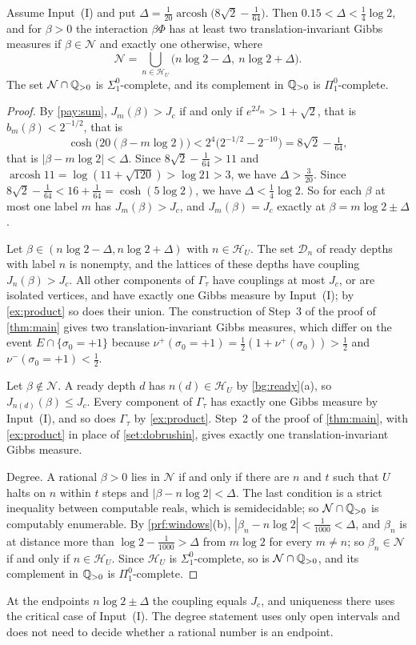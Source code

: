 \begin{proposition}\label{prop:exact}
Assume Input~(I) and put $\Delta=\frac1{20}\operatorname{arcosh}\bigl(8\sqrt2-\frac1{64}\bigr)$. Then $0.15<\Delta<\frac14\log2$, and for $\beta>0$ the interaction $\beta\Phi$ has at least two translation-invariant Gibbs measures if $\beta\in\mathcal N$ and exactly one otherwise, where
\[
\mathcal N=\bigcup_{n\in\mathcal H_U}\bigl(n\log2-\Delta,\ n\log2+\Delta\bigr).
\]
The set $\mathcal N\cap\mathbb{Q}_{>0}$ is $\Sigma^0_1$-complete, and its complement in $\mathbb{Q}_{>0}$ is $\Pi^0_1$-complete.
\end{proposition}

\begin{proof}
By \cref{pay:sum}, $J_m(\beta)>J_c$ if and only if $e^{2J_m}>1+\sqrt2$, that is $b_m(\beta)<2^{-1/2}$, that is
\[
\cosh\bigl(20(\beta-m\log2)\bigr)<2^4\bigl(2^{-1/2}-2^{-10}\bigr)=8\sqrt2-\tfrac1{64},
\]
that is $|\beta-m\log2|<\Delta$. Since $8\sqrt2-\frac1{64}>11$ and $\operatorname{arcosh}11=\log(11+\sqrt{120})>\log21>3$, we have $\Delta>\frac{3}{20}$. Since $8\sqrt2-\frac1{64}<16+\frac1{64}=\cosh(5\log2)$, we have $\Delta<\frac14\log 2$. So for each $\beta$ at most one label $m$ has $J_m(\beta)>J_c$, and $J_m(\beta)=J_c$ exactly at $\beta=m\log2\pm\Delta$.

Let $\beta\in(n\log2-\Delta,n\log2+\Delta)$ with $n\in\mathcal H_U$. The set $\mathcal D_n$ of ready depths with label $n$ is nonempty, and the lattices of these depths have coupling $J_n(\beta)>J_c$. All other components of $\Gamma_\tau$ have couplings at most $J_c$, or are isolated vertices, and have exactly one Gibbs measure by Input~(I); by \cref{ex:product} so does their union. The construction of Step~3 of the proof of \cref{thm:main} gives two translation-invariant Gibbs measures, which differ on the event $E\cap\{\sigma_0=+1\}$ because $\nu^{+}(\sigma_0=+1)=\frac12(1+\nu^+(\sigma_0))>\frac12$ and $\nu^-(\sigma_0=+1)<\frac12$.

Let $\beta\notin\mathcal N$. A ready depth $d$ has $n(d)\in\mathcal H_U$ by \cref{bg:ready}(a), so $J_{n(d)}(\beta)\le J_c$. Every component of $\Gamma_\tau$ has exactly one Gibbs measure by Input~(I), and so does $\Gamma_\tau$ by \cref{ex:product}. Step~2 of the proof of \cref{thm:main}, with \cref{ex:product} in place of \cref{set:dobrushin}, gives exactly one translation-invariant Gibbs measure.

Degree. A rational $\beta>0$ lies in $\mathcal N$ if and only if there are $n$ and $t$ such that $U$ halts on $n$ within $t$ steps and $|\beta-n\log2|<\Delta$. The last condition is a strict inequality between computable reals, which is semidecidable; so $\mathcal N\cap\mathbb{Q}_{>0}$ is computably enumerable. By \cref{prf:windows}(b), $|\beta_n-n\log2|<\frac1{1000}<\Delta$, and $\beta_n$ is at distance more than $\log2-\frac1{1000}>\Delta$ from $m\log2$ for every $m\ne n$; so $\beta_n\in\mathcal N$ if and only if $n\in\mathcal H_U$. Since $\mathcal H_U$ is $\Sigma^0_1$-complete, so is $\mathcal N\cap\mathbb{Q}_{>0}$, and its complement in $\mathbb{Q}_{>0}$ is $\Pi^0_1$-complete.
\end{proof}

At the endpoints $n\log2\pm\Delta$ the coupling equals $J_c$, and uniqueness there uses the critical case of Input~(I). The degree statement uses only open intervals and does not need to decide whether a rational number is an endpoint.
